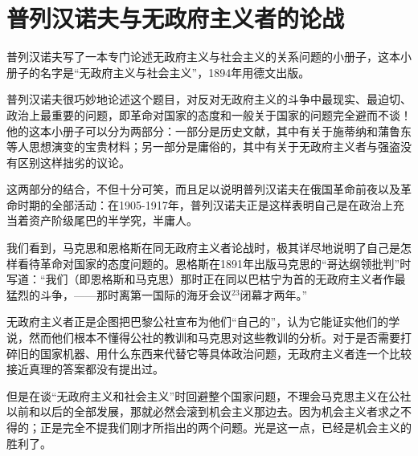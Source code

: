 \chapter{普列汉诺夫与无政府主义者的论战} %

普列汉诺夫写了一本专门论述无政府主义与社会主义的关系问题的小册子，这本小册子的名字是“无政府主义与社会主义”，1894年用德文出版。

普列汉诺夫很巧妙地论述这个题目，对反对无政府主义的斗争中最现实、最迫切、政治上最重要的问题，即革命对国家的态度和一般关于国家的问题完全避而不谈！他的这本小册子可以分为两部分：一部分是历史文献，其中有关于施蒂纳和蒲鲁东等人思想演变的宝贵材料；另一部分是庸俗的，其中有关于无政府主义者与强盗没有区别这样拙劣的议论。

这两部分的结合，不但十分可笑，而且足以说明普列汉诺夫在俄国革命前夜以及革命时期的全部活动：在1905-1917年，普列汉诺夫正是这样表明自己是在政治上充当着资产阶级尾巴的半学究，半庸人。

我们看到，马克思和恩格斯在同无政府主义者论战时，极其详尽地说明了自己是怎样看待革命对国家的态度问题的。恩格斯在1891年出版马克思的“哥达纲领批判”时写道：“我们（即恩格斯和马克思）那时正在同以巴枯宁为首的无政府主义者作最猛烈的斗争，——那时离第一国际的海牙会议$^{23}$闭幕才两年。”

无政府主义者正是企图把巴黎公社宣布为他们“自己的”，认为它能证实他们的学说，然而他们根本不懂得公社的教训和马克思对这些教训的分析。对于是否需要{\kaishu 打碎}旧的国家机器、{\kaishu 用什么东西}来代替它等具体政治问题，无政府主义者连一个比较接近真理的答案都没有提出过。

但是在谈“无政府主义和社会主义”时回避整个国家问题，{\kaishu 不理会}马克思主义在公社以前和以后的全部发展，那就必然会滚到机会主义那边去。因为机会主义者求之不得的；正是完全{\kaishu 不}提我们刚才所指出的两个问题。光是这一点，{\kaishu 已经}是机会主义的胜利了。
